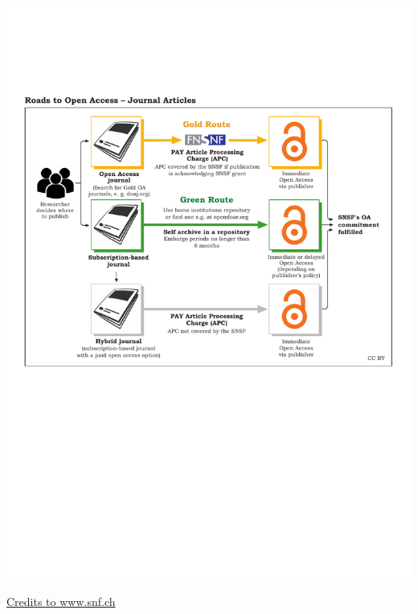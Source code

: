 \documentclass[10pt,compress,serif]{beamer}
\begin{document}
\begin{frame}[t]%
 \vskip1cm%

 \begin{center}
\includegraphics[width=.9\textwidth]{SNSF_Roads_to_OA_Articles}
\end{center}
\href{https://www.snf.ch/en/VyUvGzptStOEpUoC/topic/open-access-to-publications}{Credits to www.snf.ch}

\end{frame}
 


\begin{frame}[t]%
 \vskip1cm%
 \begin{center}%
 \end{center}%
\end{frame}
 
\end{document}
